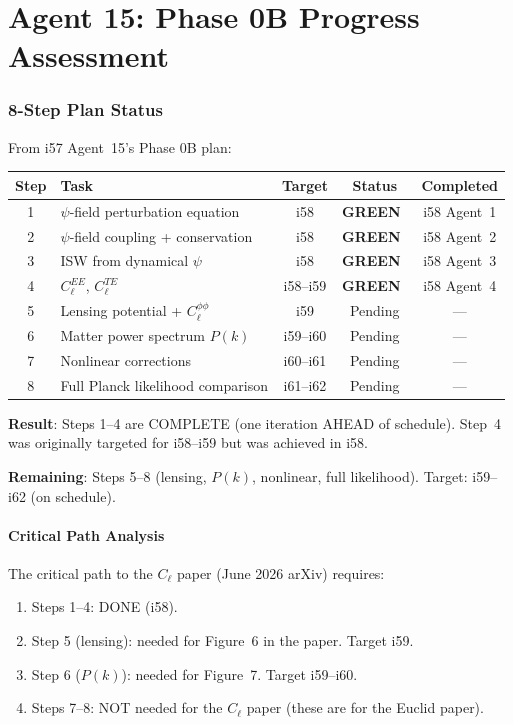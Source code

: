 \documentclass[11pt,a4paper]{article}
\newcommand{\GREEN}{\textcolor{dfdgreen}{\textbf{GREEN}}}
\begin{document}
\part{Agent 15: Phase 0B Progress Assessment}
\label{part:progress}

\section{8-Step Plan Status}

From i57 Agent~15's Phase 0B plan:

\begin{center}
\begin{longtable}{clccc}
\toprule
\textbf{Step} & \textbf{Task} & \textbf{Target} & \textbf{Status} & \textbf{Completed} \\
\midrule
1 & $\psi$-field perturbation equation & i58 & \GREEN\ & i58 Agent~1 \\
2 & $\psi$-field coupling + conservation & i58 & \GREEN\ & i58 Agent~2 \\
3 & ISW from dynamical $\psi$ & i58 & \GREEN\ & i58 Agent~3 \\
4 & $C_\ell^{EE}$, $C_\ell^{TE}$ & i58--i59 & \GREEN\ & i58 Agent~4 \\
5 & Lensing potential + $C_\ell^{\phi\phi}$ & i59 & Pending & --- \\
6 & Matter power spectrum $P(k)$ & i59--i60 & Pending & --- \\
7 & Nonlinear corrections & i60--i61 & Pending & --- \\
8 & Full Planck likelihood comparison & i61--i62 & Pending & --- \\
\bottomrule
\end{longtable}
\end{center}

\textbf{Result}: Steps 1--4 are COMPLETE (one iteration AHEAD of schedule). Step~4 was originally targeted for i58--i59 but was achieved in i58.

\textbf{Remaining}: Steps 5--8 (lensing, $P(k)$, nonlinear, full likelihood). Target: i59--i62 (on schedule).

\subsection{Critical Path Analysis}

The critical path to the $C_\ell$ paper (June 2026 arXiv) requires:
\begin{enumerate}
\item Steps 1--4: DONE (i58).
\item Step 5 (lensing): needed for Figure~6 in the paper. Target i59.
\item Step 6 ($P(k)$): needed for Figure~7. Target i59--i60.
\item Steps 7--8: NOT needed for the $C_\ell$ paper (these are for the Euclid paper).
\end{enumerate}
\end{document}
